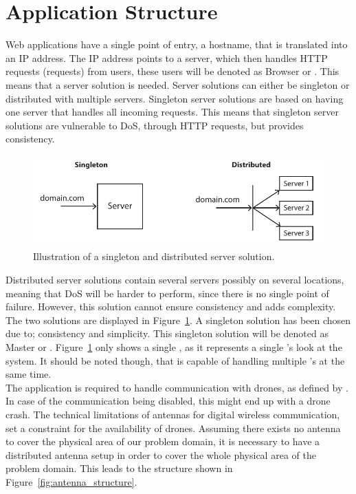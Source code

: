 \section{Application Structure}
\label{sec:application_structure}

Web applications have a single point of entry, a hostname, that is translated into an IP address.
The IP address points to a server, which then handles HTTP requests (requests) from users, these users will be denoted as Browser or .
This means that a server solution is needed.
Server solutions can either be singleton or distributed with multiple servers.
Singleton server solutions are based on having one server that handles all incoming requests.
This means that singleton server solutions are vulnerable to DoS, through HTTP requests, but provides consistency.

\begin{figure}[htb]
    \centering
    \includegraphics[width=\textwidth]{gfx/server_solutions.pdf}
    \caption{Illustration of a singleton and distributed server solution.}
    \label{fig:server_solutions}
\end{figure}

Distributed server solutions contain several servers possibly on several locations, meaning that DoS will be harder to perform, since there is no single point of failure.
However, this solution cannot ensure consistency and adds complexity.
The two solutions are displayed in Figure~\ref{fig:server_solutions}.
A singleton solution has been chosen due to; consistency and simplicity.
This singleton solution will be denoted as Master or .
Figure~\ref{fig:server_solutions} only shows a single , as it represents a single 's look at the system.
It should be noted though, that  is capable of handling multiple 's at the same time. \\

The application is required to handle communication with drones, as defined by .
In case of the communication being disabled, this might end up with a drone crash.
The technical limitations of antennas for digital wireless communication, set a constraint for the availability of drones.
Assuming there exists no antenna to cover the physical area of our problem domain, it is necessary to have a distributed antenna setup in order to cover the whole physical area of the problem domain.
This leads to the structure shown in Figure~\ref{fig:antenna_structure}.

